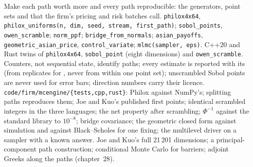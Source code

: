 \begin{build}
 Make each path worth more and every path reproducible: the generators, point sets and  that the firm's pricing and risk batches call.
 \texttt{philox4x64}, \texttt{philox\_uniforms(n, dim, seed, stream, first\_path)}; \texttt{sobol\_points}, \texttt{owen\_scramble}; \texttt{norm\_ppf};
\texttt{bridge\_from\_normals}; \texttt{asian\_payoffs}, \texttt{geometric\_asian\_price}, \texttt{control\_variate}; \texttt{mlmc(sampler, eps)}. C++20 and Rust twins of \texttt{philox4x64},
\texttt{sobol\_point} (eight dimensions) and \texttt{owen\_scramble}.
 Counters, not sequential state, identify paths; every estimate is reported with its  (from replicates for , never from within one point
set); unscrambled Sobol points are never used for error bars; direction numbers carry their licence.
 \texttt{code/firm/mcengine/\{tests,cpp,rust\}}: Philox against NumPy's; splitting paths reproduces them; Joe and Kuo's published first points; identical scrambled integers in
the three languages; the net property after scrambling; $\Phi^{-1}$ against the standard library to $10^{-8}$; bridge covariance; the geometric closed form against simulation and against
Black--Scholes for one fixing; the multilevel driver on a sampler with a known answer.
 Joe and Kuo's full 21\,201 dimensions; a principal-component path construction; conditional Monte Carlo for barriers; adjoint Greeks along the paths (chapter~28).
\end{build}

